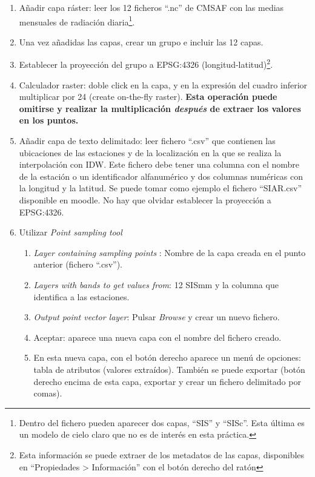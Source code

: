 \documentclass[11pt]{article}
\begin{document}
\begin{enumerate}
\item Añadir capa ráster: leer los 12 ficheros ``.nc'' de CMSAF con
  las medias mensuales de radiación diaria\footnote{Dentro del fichero
    pueden aparecer dos capas, ``SIS'' y ``SISc''. Esta última es un
    modelo de cielo claro que no es de interés en esta práctica.}.
\item Una vez añadidas las capas, crear un grupo e incluir las 12 capas.
\item Establecer la proyección del grupo a EPSG:4326 (longitud-latitud)\footnote{Esta información se puede extraer de los metadatos de las capas, disponibles en ``Propiedades > Información'' con el botón derecho del ratón}.
\item Calculador raster: doble click en la capa, y en la expresión del
  cuadro inferior multiplicar por 24 (create on-the-fly raster). \textbf{Esta
  operación puede omitirse y realizar la multiplicación \emph{después}
  de extraer los valores en los puntos.}
\item Añadir capa de texto delimitado: leer fichero ``.csv'' que
  contienen las ubicaciones de las estaciones y de la localización en la
  que se realiza la interpolación con IDW. Este fichero debe tener una
  columna con el nombre de la estación o un identificador alfanumérico
  y dos columnas numéricas con la longitud y la latitud. Se puede
  tomar como ejemplo el fichero ``SIAR.csv'' disponible en moodle. No
  hay que olvidar establecer la proyección a EPSG:4326.
\item Utilizar \emph{Point sampling tool}
  \begin{enumerate}
  \item \emph{Layer containing sampling points} : Nombre de la capa
    creada en el punto anterior (fichero ``.csv'').
  \item \emph{Layers with bands to get values from}: 12 SISmm y la
    columna que identifica a las estaciones.
  \item \emph{Output point vector layer}: Pulsar \emph{Browse} y crear
    un nuevo fichero.
  \item Aceptar: aparece una nueva capa con el nombre del fichero
    creado.
  \item En esta nueva capa, con el botón derecho aparece un menú de
    opciones: tabla de atributos (valores extraídos). También se puede
    exportar (botón derecho encima de esta capa, exportar y crear un
    fichero delimitado por comas).
  \end{enumerate}
\end{enumerate}
\end{document}
